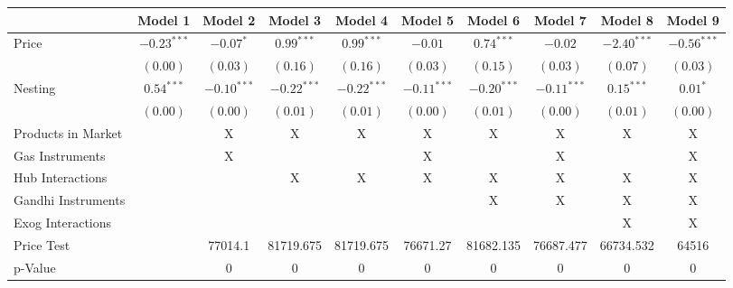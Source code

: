 
\begin{tabular}{l c c c c c c c c c}
\toprule
 & Model 1 & Model 2 & Model 3 & Model 4 & Model 5 & Model 6 & Model 7 & Model 8 & Model 9 \\
\midrule
Price                       & $-0.23^{***}$ & $-0.07^{*}$   & $0.99^{***}$  & $0.99^{***}$  & $-0.01$       & $0.74^{***}$  & $-0.02$       & $-2.40^{***}$ & $-0.56^{***}$ \\
                            & $(0.00)$      & $(0.03)$      & $(0.16)$      & $(0.16)$      & $(0.03)$      & $(0.15)$      & $(0.03)$      & $(0.07)$      & $(0.03)$      \\
Nesting                     & $0.54^{***}$  & $-0.10^{***}$ & $-0.22^{***}$ & $-0.22^{***}$ & $-0.11^{***}$ & $-0.20^{***}$ & $-0.11^{***}$ & $0.15^{***}$  & $0.01^{*}$    \\
                            & $(0.00)$      & $(0.00)$      & $(0.01)$      & $(0.01)$      & $(0.00)$      & $(0.01)$      & $(0.00)$      & $(0.01)$      & $(0.00)$      \\
\midrule
Products in Market          &               & X             & X             & X             & X             & X             & X             & X             & X             \\
Gas Instruments             &               & X             &               &               & X             &               & X             &               & X             \\
Hub Interactions            &               &               & X             & X             & X             & X             & X             & X             & X             \\
Gandhi Instruments          &               &               &               &               &               & X             & X             & X             & X             \\
Exog Interactions           &               &               &               &               &               &               &               & X             & X             \\
Price Test                  &               & 77014.1       & 81719.675     & 81719.675     & 76671.27      & 81682.135     & 76687.477     & 66734.532     & 64516         \\
p-Value                     &               & 0             & 0             & 0             & 0             & 0             & 0             & 0             & 0             \\

\end{tabular}
